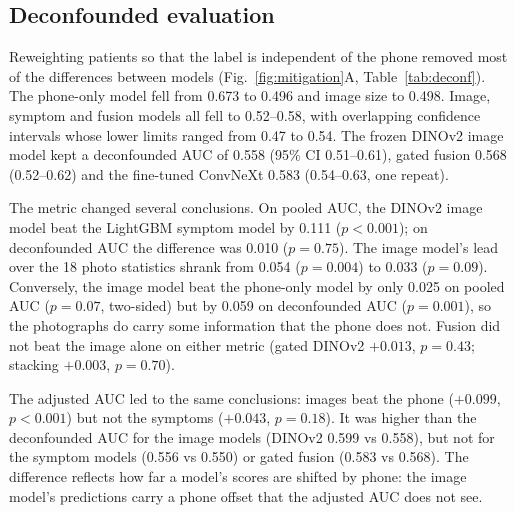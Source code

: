 \documentclass[preprint,12pt]{elsarticle}
\begin{document}
\subsection{Deconfounded evaluation}

Reweighting patients so that the label is independent of the phone removed most of the differences between models (Fig.~\ref{fig:mitigation}A, Table~\ref{tab:deconf}). The phone-only model fell from 0.673 to 0.496 and image size to 0.498. Image, symptom and fusion models all fell to 0.52--0.58, with overlapping confidence intervals whose lower limits ranged from 0.47 to 0.54. The frozen DINOv2 image model kept a deconfounded AUC of 0.558 (95\% CI 0.51--0.61), gated fusion 0.568 (0.52--0.62) and the fine-tuned ConvNeXt 0.583 (0.54--0.63, one repeat).

The metric changed several conclusions. On pooled AUC, the DINOv2 image model beat the LightGBM symptom model by 0.111 ($p < 0.001$); on deconfounded AUC the difference was 0.010 ($p = 0.75$). The image model's lead over the 18 photo statistics shrank from 0.054 ($p = 0.004$) to 0.033 ($p = 0.09$). Conversely, the image model beat the phone-only model by only 0.025 on pooled AUC ($p = 0.07$, two-sided) but by 0.059 on deconfounded AUC ($p = 0.001$), so the photographs do carry some information that the phone does not. Fusion did not beat the image alone on either metric (gated DINOv2 $+0.013$, $p = 0.43$; stacking $+0.003$, $p = 0.70$).

The adjusted AUC led to the same conclusions: images beat the phone ($+0.099$, $p < 0.001$) but not the symptoms ($+0.043$, $p = 0.18$). It was higher than the deconfounded AUC for the image models (DINOv2 0.599 vs 0.558), but not for the symptom models (0.556 vs 0.550) or gated fusion (0.583 vs 0.568). The difference reflects how far a model's scores are shifted by phone: the image model's predictions carry a phone offset that the adjusted AUC does not see.
\end{document}
